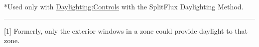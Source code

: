 *Used only with \hyperref[daylightingcontrols-000]{Daylighting:Controls} with the SplitFlux Daylighting Method.

\begin{center}\rule{0.5\linewidth}{0.4pt}\end{center}

{[}1{]} Formerly, only the exterior windows in a zone could provide daylight to that zone.
